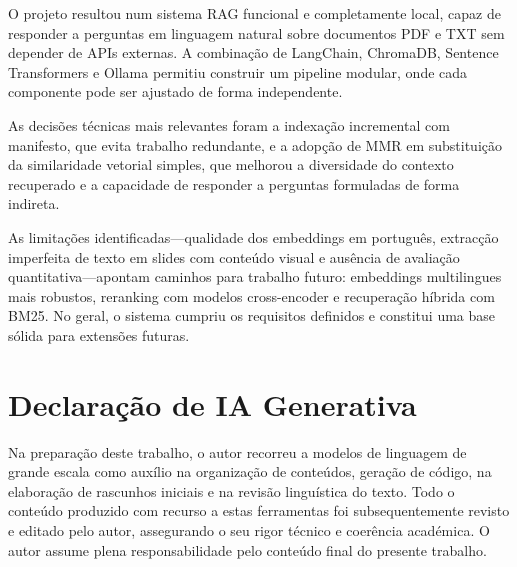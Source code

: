 \documentclass[]{ceurart}
\begin{document}
O projeto resultou num sistema RAG funcional e completamente local, capaz de
responder a perguntas em linguagem natural sobre documentos PDF e TXT sem
depender de APIs externas. A combinação de LangChain, ChromaDB, Sentence
Transformers e Ollama permitiu construir um pipeline modular, onde cada
componente pode ser ajustado de forma independente.

As decisões técnicas mais relevantes foram a indexação incremental com manifesto,
que evita trabalho redundante, e a adopção de MMR em substituição da similaridade
vetorial simples, que melhorou a diversidade do contexto recuperado e a
capacidade de responder a perguntas formuladas de forma indireta.

As limitações identificadas---qualidade dos embeddings em português, extracção
imperfeita de texto em slides com conteúdo visual e ausência de avaliação
quantitativa---apontam caminhos para trabalho futuro: embeddings multilingues
mais robustos, reranking com modelos cross-encoder e recuperação híbrida com
BM25. No geral, o sistema cumpriu os requisitos definidos e constitui uma base
sólida para extensões futuras.

\section*{Declaração de IA Generativa}

Na preparação deste trabalho, o autor recorreu a modelos de linguagem de grande
escala como auxílio na organização de conteúdos, geração de código, na elaboração
de rascunhos iniciais e na revisão linguística do texto. Todo o conteúdo produzido
com recurso a estas ferramentas foi subsequentemente revisto e editado pelo autor,
assegurando o seu rigor técnico e coerência académica. O autor assume plena
responsabilidade pelo conteúdo final do presente trabalho.
\end{document}
